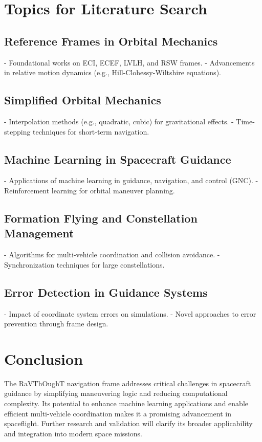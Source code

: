 % 

\section{Topics for Literature Search}

\subsection{Reference Frames in Orbital Mechanics}
- Foundational works on ECI, ECEF, LVLH, and RSW frames.
- Advancements in relative motion dynamics (e.g., Hill-Clohessy-Wiltshire equations).

\subsection{Simplified Orbital Mechanics}
- Interpolation methods (e.g., quadratic, cubic) for gravitational effects.
- Time-stepping techniques for short-term navigation.

\subsection{Machine Learning in Spacecraft Guidance}
- Applications of machine learning in guidance, navigation, and control (GNC).
- Reinforcement learning for orbital maneuver planning.

\subsection{Formation Flying and Constellation Management}
- Algorithms for multi-vehicle coordination and collision avoidance.
- Synchronization techniques for large constellations.

\subsection{Error Detection in Guidance Systems}
- Impact of coordinate system errors on simulations.
- Novel approaches to error prevention through frame design.

\section{Conclusion}

The RaVThOughT navigation frame addresses critical challenges in spacecraft guidance by simplifying maneuvering logic and reducing computational complexity. Its potential to enhance machine learning applications and enable efficient multi-vehicle coordination makes it a promising advancement in spaceflight. Further research and validation will clarify its broader applicability and integration into modern space missions.

\endinput  %
